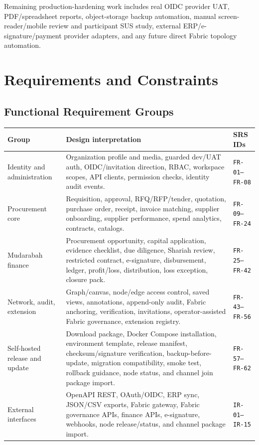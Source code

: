 \documentclass[11pt,a4paper]{article}
\newcommand{\req}[1]{\texttt{#1}}
\begin{document}
Remaining production-hardening work includes real OIDC provider UAT, PDF/spreadsheet reports, object-storage backup automation, manual screen-reader/mobile review and participant SUS study, external ERP/e-signature/payment provider adapters, and any future direct Fabric topology automation.

\section{Requirements and Constraints}
\subsection{Functional Requirement Groups}
\begin{longtable}{L{38mm}L{88mm}L{25mm}}
\toprule
\textbf{Group} & \textbf{Design interpretation} & \textbf{SRS IDs} \\
\midrule
Identity and administration & Organization profile and media, guarded dev/UAT auth, OIDC/invitation direction, RBAC, workspace scopes, API clients, permission checks, identity audit events. & \req{FR-01--FR-08} \\
Procurement core & Requisition, approval, RFQ/RFP/tender, quotation, purchase order, receipt, invoice matching, supplier onboarding, supplier performance, spend analytics, contracts, catalogs. & \req{FR-09--FR-24} \\
Mudarabah finance & Procurement opportunity, capital application, evidence checklist, due diligence, Shariah review, restricted contract, e-signature, disbursement, ledger, profit/loss, distribution, loss exception, closure pack. & \req{FR-25--FR-42} \\
Network, audit, extension & Graph/canvas, node/edge access control, saved views, annotations, append-only audit, Fabric anchoring, verification, invitations, operator-assisted Fabric governance, extension registry. & \req{FR-43--FR-56} \\
Self-hosted release and update & Download package, Docker Compose installation, environment template, release manifest, checksum/signature verification, backup-before-update, migration compatibility, smoke test, rollback guidance, node status, and channel join package import. & \req{FR-57--FR-62} \\
External interfaces & OpenAPI REST, OAuth/OIDC, ERP sync, JSON/CSV exports, Fabric gateway, Fabric governance APIs, finance APIs, e-signature, webhooks, node release/status, and channel package import. & \req{IR-01--IR-15} \\
\bottomrule
\end{longtable}
\end{document}
